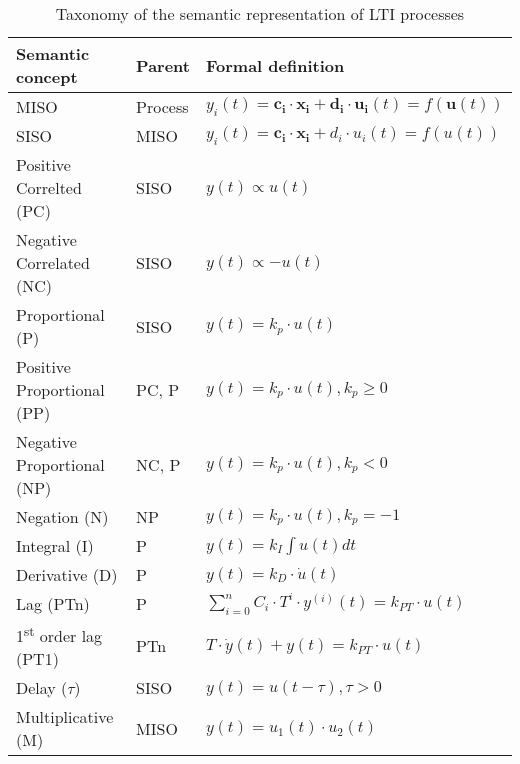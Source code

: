 \begin{table}
  \centering
  \caption{Taxonomy of the semantic representation of LTI processes}
  \label{tab:lti_taxonomy}

  \begin{tabular}{lll}\hline
    \textbf{Semantic concept} & \textbf{Parent} & \textbf{Formal definition} \\\hline
    MISO & Process & $y_i(t)=\mathbf{c_i}\cdot \mathbf{x_i}+\mathbf{d_i}\cdot \mathbf{u_i}(t)=f(\mathbf{u}(t))$ \\\hline
    SISO & MISO & $y_i(t)=\mathbf{c_i}\cdot \mathbf{x_i}+d_i\cdot u_i(t)=f(u(t))$ \\\hline
    Positive Correlted (PC) & SISO & $y(t)\propto u(t)$ \\
    Negative Correlated (NC) & SISO & $y(t)\propto -u(t)$ \\
    Proportional (P) & SISO & $y(t)=k_p\cdot u(t)$ \\
    Positive Proportional (PP) & PC, P & $y(t)=k_p\cdot u(t), k_p\geq 0$\\
    Negative Proportional (NP) & NC, P & $y(t)=k_p\cdot u(t), k_p<0$\\
    Negation (N) & NP & $y(t)=k_p\cdot u(t), k_p=-1$\\
    Integral (I) & P & $y(t)=k_I\int u(t)dt$\\
    Derivative (D) & P & $y(t)=k_D\cdot\dot u(t)$\\
    Lag (PTn) & P & $\sum_{i=0}^{n}C_i\cdot T^i \cdot y^{(i)}(t)=k_{PT}\cdot u(t) $\\
    1\textsuperscript{st} order lag (PT1) & PTn & $T\cdot\dot y(t)+y(t)=k_{PT}\cdot u(t)$\\
    Delay ($\tau$) & SISO & $y(t)=u(t-\tau), \tau>0$\\
    Multiplicative (M) & MISO & $y(t)=u_1(t)\cdot u_2(t)$
  \end{tabular}
\end{table}

